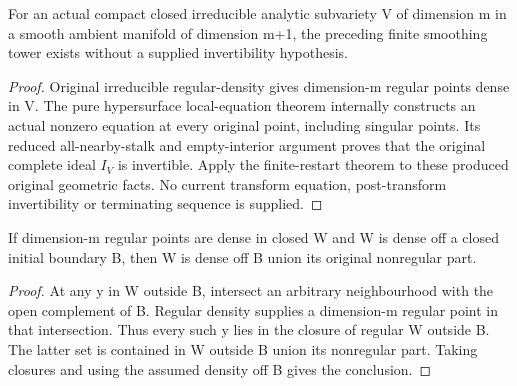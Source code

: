 \begin{corollary}
\label{hir:natural-irreducible-hypersurface-smoothing}
\leanok
For an actual compact closed irreducible analytic subvariety V of
dimension m in a smooth ambient manifold of dimension m+1, the preceding
finite smoothing tower exists without a supplied invertibility hypothesis.
\end{corollary}
\begin{proof}
Original irreducible regular-density gives dimension-m regular points
dense in V. The pure hypersurface local-equation theorem internally
constructs an actual nonzero equation at every original point, including
singular points. Its reduced all-nearby-stalk and empty-interior argument
proves that the original complete ideal $I_V$ is invertible. Apply the finite-restart theorem to these
produced original geometric facts. No current transform equation,
post-transform invertibility or terminating sequence is supplied.
\end{proof}

\begin{lemma}
\label{hir:regular-density-outside-boundary-union-singular}
\leanok
If dimension-m regular points are dense in closed W and W is dense
off a closed initial boundary B, then W is dense off B union its
original nonregular part.
\end{lemma}
\begin{proof}
At any y in W outside B, intersect an arbitrary neighbourhood with
the open complement of B. Regular density supplies a dimension-m
regular point in that intersection. Thus every such y lies in the
closure of regular W outside B. The latter set is contained in W
outside B union its nonregular part. Taking closures and using the
assumed density off B gives the conclusion.
\end{proof}

